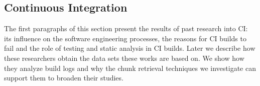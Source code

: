 \documentclass[\myrootdir/main.tex]{subfiles}
\begin{document}
\subsection{Continuous Integration}
\label{sec:rw-ci}
The first paragraphs of this section present the results of past research into CI: its influence on the software engineering processes, the reasons for CI builds to fail and the role of testing and static analysis in CI builds.
Later we describe how these researchers obtain the data sets these works are based on.
We show how they analyze build logs and why the chunk retrieval techniques we investigate can support them to broaden their studies.
\end{document}
